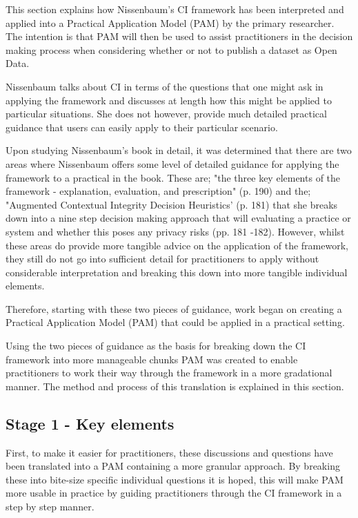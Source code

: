 This section explains how Nissenbaum's CI framework has been interpreted and applied into a Practical Application Model (PAM) by the primary researcher. The intention is that PAM will then be used to assist practitioners in the decision making process when considering whether or not to publish a dataset as Open Data.

Nissenbaum talks about CI in terms of the questions that one might ask in applying the framework and discusses at length how this might be applied to particular situations. She does not however, provide much detailed practical guidance that users can easily apply to their particular scenario.

Upon studying Nissenbaum's book in detail, it was determined that there are two areas where Nissenbaum offers some level of detailed guidance for applying the framework to a practical in the book. These are; "the three key elements of the framework - explanation, evaluation, and prescription" (p. 190) and the; "Augmented Contextual Integrity Decision Heuristics' (p. 181) that she breaks down into a nine step decision making approach that will evaluating a practice or system and whether this poses any privacy risks (pp. 181 -182). However, whilst these areas do provide more tangible advice on the application of the framework, they still do not go into sufficient detail for practitioners to apply without considerable interpretation and breaking this down into more tangible individual elements. 

Therefore, starting with these two pieces of guidance, work began on creating a Practical Application Model (PAM) that could be applied in a practical setting. 

Using the two pieces of guidance as the basis for breaking down the CI framework into more manageable chunks PAM was created to enable practitioners to work their way through the framework in a more gradational manner. The method and process of this translation is explained in this section.

\subsection {Stage 1 - Key elements}

First, to make it easier for practitioners, these discussions and questions have been translated into a PAM containing a more granular approach. By breaking these into bite-size specific individual questions it is hoped, this will make PAM more usable in practice by guiding practitioners through the CI framework in a step by step manner.

